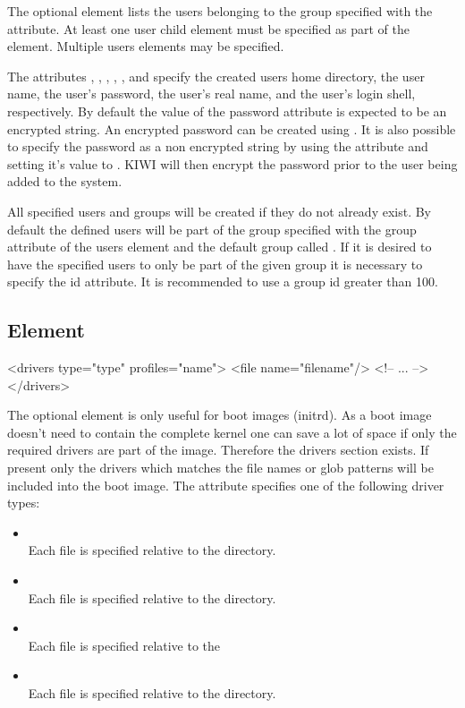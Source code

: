 The optional  element lists the users belonging to the group specified
with the  attribute. At least one user child element must be specified
as part of the  element. Multiple users elements may be specified.

The attributes , , , , 
, and  specify the created
users home directory, the user name, the user's password, the user's 
real name, and the user's login shell, respectively. By default the value
of the password attribute is expected to be an encrypted string. An
encrypted password can be created using  . It
is also possible to specify the password as a non encrypted string by using
the  attribute and setting it's value to . KIWI will then
encrypt the password prior to the user being added to the system.

All specified users and groups will be created if they do not already exist.
By default the defined users will be part of the group specified with the 
group attribute of the users element and the default group called .
If it is desired to have the specified users to only be part of the given
group it is necessary to specify the id attribute. It is recommended to use
a group id greater than 100.

\subsection{ Element}
\begin{xml}
<drivers type="type" profiles="name">
  <file name="filename"/>
  <!-- ... -->
</drivers>
\end{xml}

The optional  element is only useful for boot images (initrd).
As a boot image doesn't need to contain the complete kernel one can
save a lot of space if only the required drivers are part of the image.
Therefore the drivers section exists. If present only the drivers which
matches the file names or glob patterns will be included into the
boot image. The  attribute specifies one of the following driver
types:

\begin{itemize}
\item {}\\
      Each file is specified relative to the
       directory.
\item {}\\
      Each file is specified relative to the
      directory.
\item {}\\
      Each file is specified relative to the
\item {}\\
      Each file is specified relative to the
       directory.
\end{itemize}

